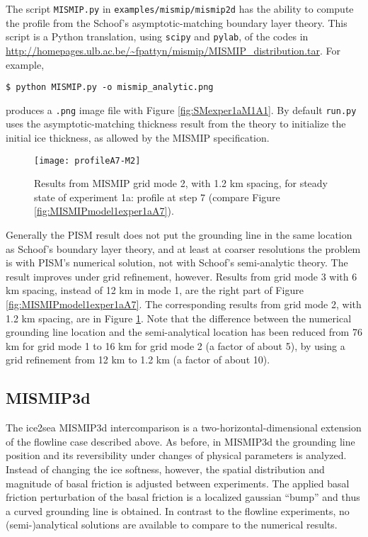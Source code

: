 The script \texttt{MISMIP.py} in \texttt{examples/mismip/mismip2d} has the ability to compute the profile from the Schoof's \cite{SchoofMarine1} asymptotic-matching boundary layer theory.  This script is a Python translation, using \texttt{scipy} and \texttt{pylab}, of the \Matlab codes in \url{http://homepages.ulb.ac.be/~fpattyn/mismip/MISMIP_distribution.tar}.  For example,

\begin{verbatim}
$ python MISMIP.py -o mismip_analytic.png
\end{verbatim}
 
\noindent produces a \verb|.png| image file with Figure \ref{fig:SMexper1aM1A1}.  By default \texttt{run.py} uses the asymptotic-matching thickness result from the \cite{SchoofMarine1} theory to initialize the initial ice thickness, as allowed by the MISMIP specification.

\begin{figure}[ht]
\centering
\texttt{[image: profileA7-M2]}
\caption{Results from MISMIP grid mode 2, with 1.2 km spacing, for steady state of experiment 1a: profile at step 7 (compare Figure \ref{fig:MISMIPmodel1exper1aA7}).}
\label{fig:MISMIPmode2results}
\end{figure}

Generally the PISM result does not put the grounding line in the same location as Schoof's boundary layer theory, and at least at coarser resolutions the problem is with PISM's numerical solution, not with Schoof's semi-analytic theory.  The result improves under grid refinement, however.  Results from grid mode 3 with 6 km spacing, instead of 12 km in mode 1, are the right part of Figure \ref{fig:MISMIPmodel1exper1aA7}.  The corresponding results from grid mode 2, with 1.2 km spacing, are in Figure \ref{fig:MISMIPmode2results}.  Note that the difference between the numerical grounding line location and the semi-analytical location has been reduced from 76 km for grid mode 1 to 16 km for grid mode 2 (a factor of about 5), by using a grid refinement from 12 km to 1.2 km (a factor of about 10).


\subsection{MISMIP3d}\label{subsect:MISMIP3d}
The ice2sea MISMIP3d intercomparison is a two-horizontal-dimensional extension of the flowline case described above.  As before, in MISMIP3d the grounding line position and its reversibility under changes of physical parameters is analyzed.  Instead of changing the ice softness, however, the spatial distribution and magnitude of basal friction is adjusted between experiments.  The applied basal friction perturbation of the basal friction is a localized gaussian ``bump'' and thus a curved grounding line is obtained.  In contrast to the flowline experiments, no (semi-)analytical solutions are available to compare to the numerical results.

